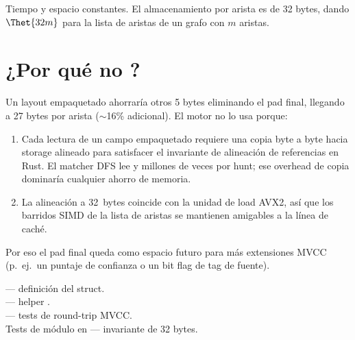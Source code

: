 \begin{complexity}
Tiempo y espacio constantes. El almacenamiento por arista es de
32 bytes, dando $\Thet{32 m}$ para la lista de aristas de un
grafo con $m$ aristas.
\end{complexity}

\section{¿Por qué no ?}

Un layout empaquetado ahorraría otros 5 bytes eliminando el pad
final, llegando a 27 bytes por arista ($\sim$16\% adicional). El
motor no lo usa porque:

\begin{enumerate}
    \item Cada lectura de un campo empaquetado requiere una copia
        byte a byte hacia storage alineado para satisfacer el
        invariante de alineación de referencias en Rust. El
        matcher DFS lee  y 
        millones de veces por hunt; ese overhead de copia
        dominaría cualquier ahorro de memoria.
    \item La alineación a 32~bytes coincide con la unidad de load
        AVX2, así que los barridos SIMD de la lista de aristas se
        mantienen amigables a la línea de caché.
\end{enumerate}

Por eso el pad final queda como espacio futuro para más
extensiones MVCC (p.~ej.\ un puntaje de confianza o un bit flag
de tag de fuente).

\begin{inthecode}
 --- definición
del struct.\\
 --- helper
.\\
 ---
tests de round-trip MVCC.\\
Tests de módulo en 
--- invariante de 32 bytes.
\end{inthecode}
